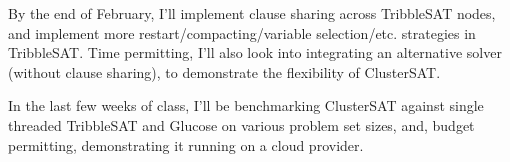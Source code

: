 \documentclass[10pt]{article}
\begin{document}
  By the end of February, I'll implement clause sharing across TribbleSAT nodes, and implement more 
  restart/compacting/variable selection/etc. strategies in TribbleSAT.  Time permitting, I'll also look into integrating an alternative 
  solver (without clause sharing), to demonstrate the flexibility of ClusterSAT.

  In the last few weeks of class, I'll be benchmarking ClusterSAT against single threaded TribbleSAT and Glucose on various
  problem set sizes, and, budget permitting, demonstrating it running on a cloud provider.
\end{document}
